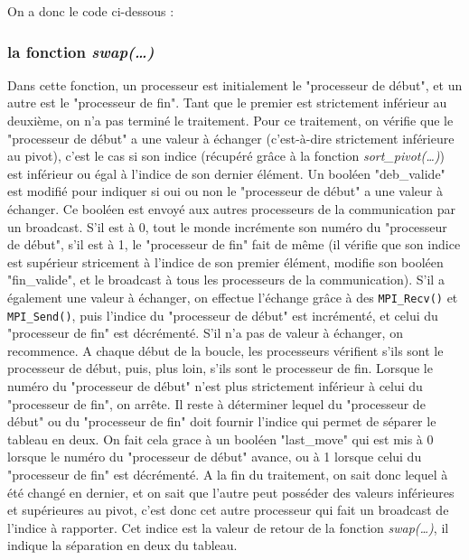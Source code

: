 On a donc le code ci-dessous :


\cleardoublepage
\subsubsection*{la fonction \textit{swap(\dots)}}
Dans cette fonction, un processeur est initialement le "processeur de début", et un autre est le "processeur de fin". Tant que le premier est strictement inférieur au deuxième, on n'a pas terminé le traitement. Pour ce traitement, on vérifie que le "processeur de début" a une valeur à échanger (c'est-à-dire strictement inférieure au pivot), c'est le cas si son indice (récupéré grâce à la fonction \textit{sort\_pivot(\dots)}) est inférieur ou égal à l'indice de son dernier élément. Un booléen "deb\_valide" est modifié pour indiquer si oui ou non le "processeur de début" a une valeur à échanger. Ce booléen est envoyé aux autres processeurs de la communication par un broadcast. S'il est à 0, tout le monde incrémente son numéro du "processeur de début", s'il est à 1, le "processeur de fin" fait de même (il vérifie que son indice est supérieur stricement à l'indice de son premier élément, modifie son booléen "fin\_valide", et le broadcast à tous les processeurs de la communication). S'il a également une valeur à échanger, on effectue l'échange grâce à des \verb+MPI_Recv()+ et \verb+MPI_Send()+, puis l'indice du "processeur de début" est incrémenté, et celui du "processeur de fin" est décrémenté. S'il n'a pas de valeur à échanger, on recommence.
A chaque début de la boucle, les processeurs vérifient s'ils sont le processeur de début, puis, plus loin, s'ils sont le processeur de fin.
Lorsque le numéro du "processeur de début" n'est plus strictement inférieur à celui du "processeur de fin", on arrête. Il reste à déterminer lequel du "processeur de début" ou du "processeur de fin" doit fournir l'indice qui permet de séparer le tableau en deux. On fait cela grace à un booléen "last\_move" qui est mis à 0 lorsque le numéro du "processeur de début" avance, ou à 1 lorsque celui du "processeur de fin" est décrémenté. A la fin du traitement, on sait donc lequel à été changé en dernier, et on sait que l'autre peut posséder des valeurs inférieures et supérieures au pivot, c'est donc cet autre processeur qui fait un broadcast de l'indice à rapporter. Cet indice est la valeur de retour de la fonction \textit{swap(\dots)}, il indique la séparation en deux du tableau.

